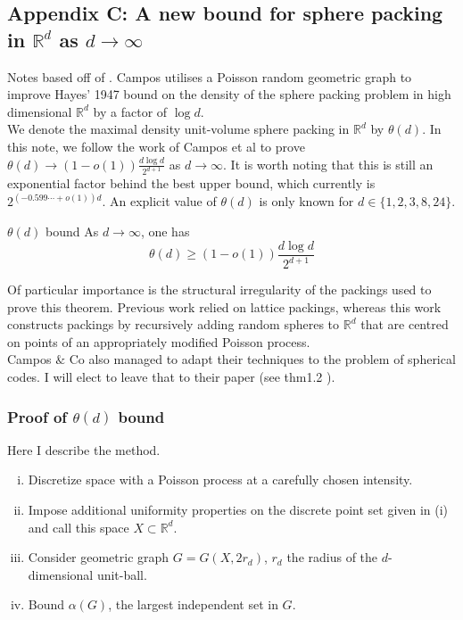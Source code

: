 \documentclass{article}
\begin{document}
\newpage 

\subsection{Appendix C: A new bound for sphere packing in $\mathbb{R}^d$ as $d \to \infty$}

Notes based off of \cite{campos2023}. Campos utilises a Poisson random geometric graph to improve Hayes' 1947 
bound on the density of the sphere packing problem in high dimensional $\mathbb{R}^d$ by a factor of $\log d$. \\

We denote the maximal density unit-volume sphere packing in $\mathbb{R}^d$ by $\theta(d)$. In this note, we follow 
the work of Campos et al to prove $\theta(d) \to (1 - o(1))\frac{d\log d}{2^{d+1}}$ as $d \to \infty$. It is worth 
noting that this is still an exponential factor behind the best upper bound, which currently is $2^{(-0.599\cdots + o(1))d}$.
An explicit value of $\theta(d)$ is only known for $d \in \{1,2,3,8,24\}$. 

\begin{theorem}[]{$\theta(d)$ bound}
    As $d \to \infty$, one has \[\theta(d) \geq (1 - o(1))\frac{d\log d}{2^{d+1}}\] 
\end{theorem}

Of particular importance is the structural irregularity of the packings used to prove this theorem. Previous work 
relied on lattice packings, whereas this work constructs packings by recursively adding random spheres to $\mathbb{R}^d$
that are centred on points of an appropriately modified Poisson process. \\

Campos $\&$ Co also managed to adapt their techniques to the problem of spherical codes. I will elect to leave that 
to their paper (see thm1.2 \cite{campos2023}).

\subsubsection*{Proof of $\theta(d)$ bound}

Here I describe the method. 
\begin{enumerate}[(i)]
    \item Discretize space with a Poisson process at a carefully chosen intensity.
    \item Impose additional uniformity properties on the discrete point set given in (i) and
    call this space $X \subset \mathbb{R}^d$.
    \item Consider geometric graph $G = G(X, 2r_d)$, $r_d$ the radius of the $d$-dimensional unit-ball.
    \item Bound $\alpha(G)$, the largest independent set in $G$. 
\end{enumerate}
\end{document}
